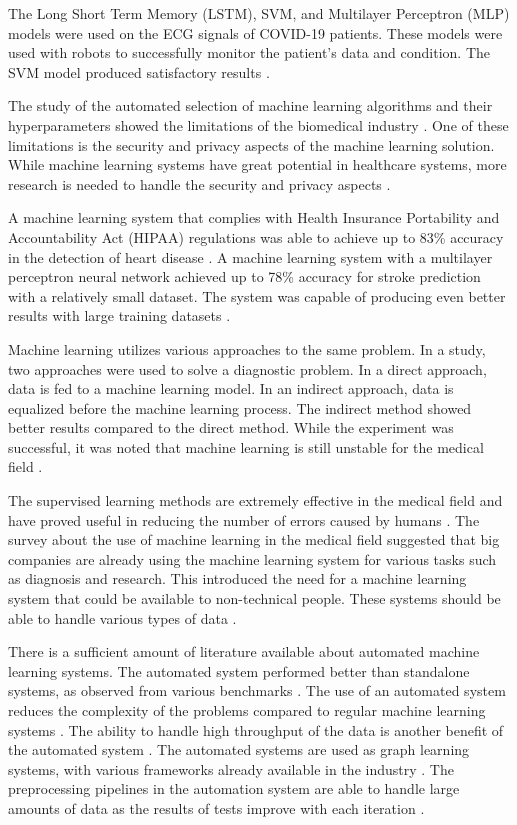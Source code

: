 \documentclass[a4paper,fleqn]{cas-dc}
\begin{document}
The Long Short Term Memory (LSTM), SVM, and Multilayer Perceptron (MLP) models were used on the ECG signals of COVID-19 patients. These models were used with robots to successfully monitor the patient's data and condition. The SVM model produced satisfactory results \cite{ref_paper_40}.

The study of the automated selection of machine learning algorithms and their hyperparameters showed the limitations of the biomedical industry \cite{ref_paper_32}. One of these limitations is the security and privacy aspects of the machine learning solution. While machine learning systems have great potential in healthcare systems, more research is needed to handle the security and privacy aspects \cite{ref_paper_37}.

A machine learning system that complies with Health Insurance Portability and Accountability Act (HIPAA) regulations was able to achieve up to 83\% accuracy in the detection of heart disease \cite{ref_paper_41}. A machine learning system with a multilayer perceptron neural network achieved up to 78\% accuracy for stroke prediction with a relatively small dataset. The system was capable of producing even better results with large training datasets \cite{ref_paper_42}.

Machine learning utilizes various approaches to the same problem. In a study, two approaches were used to solve a diagnostic problem. In a direct approach, data is fed to a machine learning model. In an indirect approach, data is equalized before the machine learning process. The indirect method showed better results compared to the direct method. While the experiment was successful, it was noted that machine learning is still unstable for the medical field \cite{ref_paper_8}.

The supervised learning methods are extremely effective in the medical field and have proved useful in reducing the number of errors caused by humans \cite{ref_paper_11}. The survey about the use of machine learning in the medical field suggested that big companies are already using the machine learning system for various tasks such as diagnosis and research. This introduced the need for a machine learning system that could be available to non-technical people. These systems should be able to handle various types of data \cite{ref_paper_33}.

There is a sufficient amount of literature available about automated machine learning systems. The automated system performed better than standalone systems, as observed from various benchmarks \cite{ref_paper_a_5}. The use of an automated system reduces the complexity of the problems compared to regular machine learning systems \cite{ref_paper_a_1}. The ability to handle high throughput of the data is another benefit of the automated system \cite{ref_paper_a_3}. The automated systems are used as graph learning systems, with various frameworks already available in the industry \cite{ref_paper_a_4}. The preprocessing pipelines in the automation system are able to handle large amounts of data as the results of tests improve with each iteration \cite{ref_paper_a_12}.
\end{document}
